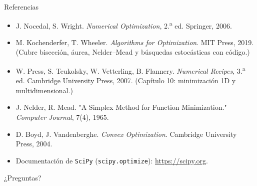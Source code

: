 \documentclass[aspectratio=169,10pt]{beamer}
\begin{document}
\begin{frame}{Referencias}
  \footnotesize
  \begin{itemize}
    \item J. Nocedal, S. Wright. \emph{Numerical Optimization}, 2.\textsuperscript{a}
      ed. Springer, 2006.
    \item M. Kochenderfer, T. Wheeler. \emph{Algorithms for Optimization}.
      MIT Press, 2019. (Cubre bisección, áurea, Nelder--Mead y búsquedas
      estocásticas con código.)
    \item W. Press, S. Teukolsky, W. Vetterling, B. Flannery.
      \emph{Numerical Recipes}, 3.\textsuperscript{a} ed. Cambridge
      University Press, 2007. (Capítulo 10: minimización 1D y
      multidimensional.)
    \item J. Nelder, R. Mead. "A Simplex Method for Function
      Minimization." \emph{Computer Journal}, 7(4), 1965.
    \item D. Boyd, J. Vandenberghe. \emph{Convex Optimization}.
      Cambridge University Press, 2004.
    \item Documentación de \texttt{SciPy}
      (\texttt{scipy.optimize}): \url{https://scipy.org}.
  \end{itemize}
\end{frame}

\begin{frame}[standout]
  ¿Preguntas?
\end{frame}
\end{document}
